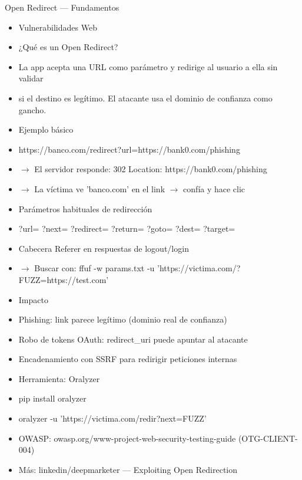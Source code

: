 \documentclass[aspectratio=169,10pt]{beamer}
\begin{document}
\begin{frame}[allowframebreaks]{Open Redirect --- Fundamentos}
\small
  \begin{itemize}
  \item Vulnerabilidades Web
  \item ¿Qué es un Open Redirect?
  \item La app acepta una URL como parámetro y redirige al usuario a ella sin validar
  \item si el destino es legítimo. El atacante usa el dominio de confianza como gancho.
  \item Ejemplo básico
  \item https://banco.com/redirect?url=https://bank0.com/phishing
  \item $\rightarrow$ El servidor responde: 302 Location: https://bank0.com/phishing
  \item $\rightarrow$ La víctima ve 'banco.com' en el link $\rightarrow$ confía y hace clic
  \item Parámetros habituales de redirección
  \item ?url= ?next= ?redirect= ?return= ?goto= ?dest= ?target=
  \item Cabecera Referer en respuestas de logout/login
  \item $\rightarrow$ Buscar con: ffuf -w params.txt -u 'https://victima.com/?FUZZ=https://test.com'
  \item Impacto
  \item Phishing: link parece legítimo (dominio real de confianza)
  \item Robo de tokens OAuth: redirect\_uri puede apuntar al atacante
  \item Encadenamiento con SSRF para redirigir peticiones internas
  \item Herramienta: Oralyzer
  \item pip install oralyzer
  \item oralyzer -u 'https://victima.com/redir?next=FUZZ'
  \item OWASP: owasp.org/www-project-web-security-testing-guide (OTG-CLIENT-004)
  \item Más: linkedin/deepmarketer --- Exploiting Open Redirection
  \end{itemize}
\end{frame}
\end{document}
